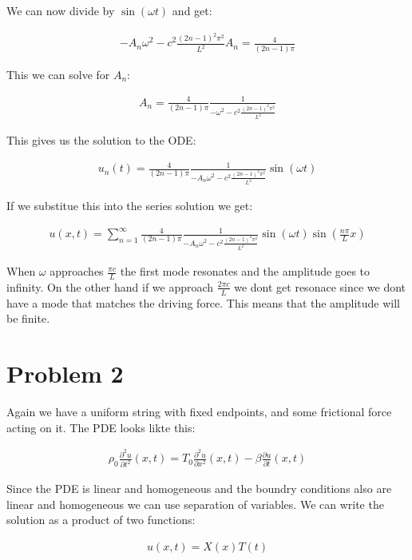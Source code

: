 \documentclass[a4paper]{article}
\begin{document}
We can now divide by $\sin(\omega t)$ and get:

\begin{align*}
    -A_n \omega^2 - c^2 \frac{(2n-1)^2 \pi^2}{L^2} A_n = \frac{4}{(2n-1) \pi}
\end{align*}

This we can solve for $A_n$:

\begin{align*}
    A_n = \frac{4}{(2n-1) \pi} \frac{1}{-\omega^2 - c^2 \frac{(2n-1)^2 \pi^2}{L^2}}
\end{align*}

This gives us the solution to the ODE:

\begin{align*}
    u_n(t) = \frac{4}{(2n-1) \pi} \frac{1}{-A_n \omega^2 - c^2 \frac{(2n-1)^2 \pi^2}{L^2}} \sin(\omega t)
\end{align*}

If we substitue this into the series solution we get:

\begin{align*}
    u(x,t) = \sum_{n=1}^{\infty} \frac{4}{(2n-1) \pi} \frac{1}{-A_n \omega^2 - c^2 \frac{(2n-1)^2 \pi^2}{L^2}} \sin(\omega t) \sin \left(\frac{n \pi}{L}x \right)
\end{align*}

When $\omega$ approaches $\frac{\pi c}{L}$ the first mode resonates and the amplitude goes to infinity. On the other hand if we approach $\frac{2 \pi c}{L}$ we dont get resonace since we dont have a mode that matches the driving force. This means that the amplitude will be finite.

\section*{Problem 2}

Again we have a uniform string  with fixed endpoints, and some frictional force acting on it. The PDE looks likte this:

\begin{align*}
    \rho_0\frac{\partial^2 u }{\partial t^2}(x,t) = T_0 \frac{\partial^2 u}{\partial x^2}(x,t) - \beta \frac{\partial u}{\partial t}(x,t)
\end{align*}

Since the PDE is linear and homogeneous and the boundry conditions also are linear and homogeneous we can use separation of variables. We can write the solution as a product of two functions:

\begin{align*}
    u(x,t) = X(x)T(t)
\end{align*}
\end{document}
